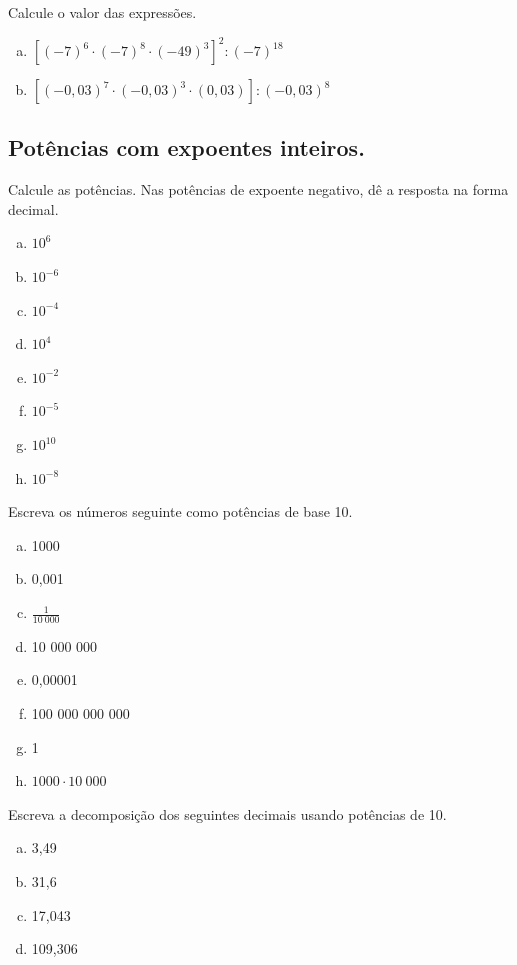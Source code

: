 \item Calcule o valor das expressões.
\begin{enumerate}[a)]
	\item $[(-7)^6\cdot (-7)^8\cdot (-49)^3]^2:(-7)^{18}$
	\item $[(-0,03)^7\cdot (-0,03)^3\cdot(0,03)]:(-0,03)^8$
\end{enumerate}


\subsection{Potências com expoentes inteiros.}

\item Calcule as potências. Nas potências de expoente negativo, dê a resposta na forma decimal.
\begin{multicols}{4}
\begin{enumerate}[a)]
	\item $10^6$
	\item $10^{-6}$
	\item $10^{-4}$
	\item $10^4$
	\item $10^{-2}$
	\item $10^{-5}$
	\item $10^{10}$
	\item $10^{-8}$
\end{enumerate}
\end{multicols}

\item Escreva os números seguinte como potências de base 10.
\begin{multicols}{4}
\begin{enumerate}[a)]
	\item 1000
	\item 0,001
	\item $\displaystyle\frac{1}{10\ 000}$
	\item 10 000 000
	\item 0,00001
	\item 100 000 000 000
	\item 1
	\item $1000\cdot10\ 000$
\end{enumerate}
\end{multicols}

\item Escreva a decomposição dos seguintes decimais usando potências de 10.
\begin{multicols}{4}
\begin{enumerate}[a)]
	\item 3,49
	\item 31,6
	\item 17,043
	\item 109,306
\end{enumerate}
\end{multicols}

